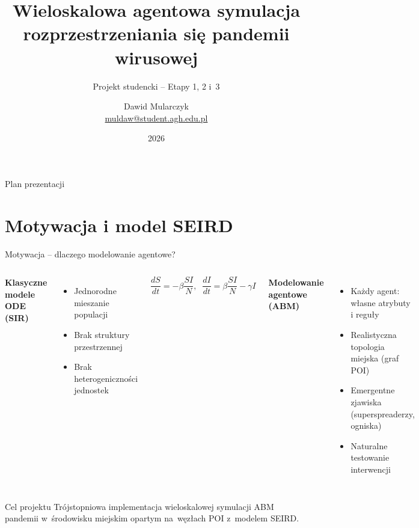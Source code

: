 \documentclass[aspectratio=1610, polish]{beamer}
\author[D. Mularczyk -- WI AGH]{Dawid Mularczyk\\
  {\scriptsize \href{mailto:muldaw@student.agh.edu.pl}{muldaw@student.agh.edu.pl}}
}
\institute[WI AGH]{Wydział Informatyki\\
  Akademia Górniczo-Hutnicza\\
  30-059 Kraków
}
\title[Symulacja pandemii -- ABM]{Wieloskalowa agentowa symulacja\\
  rozprzestrzeniania się pandemii wirusowej}
\subtitle{Projekt studencki -- Etapy 1, 2 i~3}
\date{2026}
\begin{document}
\maketitle

\begin{frame}{Plan prezentacji}
  \tableofcontents
\end{frame}

\section{Motywacja i model SEIRD}

\begin{frame}{Motywacja -- dlaczego modelowanie agentowe?}
  \begin{columns}[T]
    \textbf{Klasyczne modele ODE (SIR)}
    \begin{itemize}
      \item Jednorodne mieszanie populacji
      \item Brak struktury przestrzennej
      \item Brak heterogeniczności jednostek
    \end{itemize}
    \[
      \frac{dS}{dt} = -\beta \frac{SI}{N},\;\;
      \frac{dI}{dt} = \beta \frac{SI}{N} - \gamma I
    \]

    \textbf{Modelowanie agentowe (ABM)}
    \begin{itemize}
      \item Każdy agent: własne atrybuty i reguły
      \item Realistyczna topologia miejska (graf POI)
      \item Emergentne zjawiska (superspreaderzy, ogniska)
      \item Naturalne testowanie interwencji
    \end{itemize}
  \end{columns}

  \vspace{0.5cm}
  \begin{block}{Cel projektu}
    Trójstopniowa implementacja wieloskalowej symulacji ABM pandemii
    w~środowisku miejskim opartym na~węzłach POI z~modelem SEIRD.
  \end{block}
\end{frame}
\end{document}

